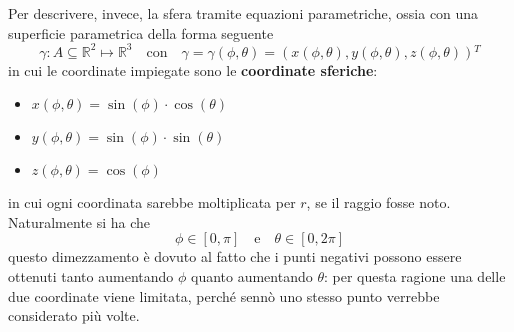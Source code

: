\documentclass[a4paper]{extarticle}
\begin{document}
\vspace{1em}
\noindent
Per descrivere, invece, la sfera tramite equazioni parametriche, ossia con una superficie parametrica della forma seguente
\[\gamma : A \subseteq \mathbb{R}^2 \longmapsto \mathbb{R}^3 \hspace{1em} \text{con} \hspace{1em} \gamma=\gamma(\phi,\theta)=(x(\phi,\theta),y(\phi,\theta),z(\phi,\theta)){^T}\]
in cui le coordinate impiegate sono le \textbf{coordinate sferiche}:
\begin{itemize}
    \item $x(\phi,\theta)=\sin(\phi) \cdot \cos(\theta)$
    \item $y(\phi,\theta)=\sin(\phi) \cdot \sin(\theta)$
    \item $z(\phi,\theta)=\cos(\phi)$
\end{itemize}
in cui ogni coordinata sarebbe moltiplicata per $r$, se il raggio fosse noto. Naturalmente si ha che
\[\phi \in [0,\pi] \hspace{1em} \text{e} \hspace{1em} \theta \in [0,2\pi]\]
questo dimezzamento è dovuto al fatto che i punti negativi possono essere ottenuti tanto aumentando $\phi$ quanto aumentando $\theta$: per questa ragione una delle due coordinate viene limitata, perché sennò uno stesso punto verrebbe considerato più volte.

\begin{figure}[H]
    \centering

\end{figure}
\end{document}
